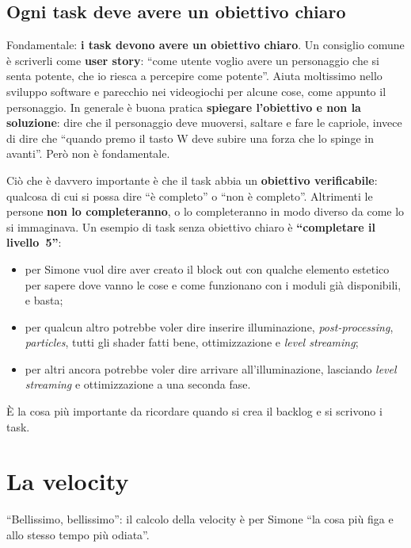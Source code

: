 \subsection{Ogni task deve avere un obiettivo chiaro}

Fondamentale: \textbf{i task devono avere un obiettivo chiaro}. Un consiglio
comune è scriverli come \textbf{user story}: ``come utente voglio avere un
personaggio che si senta potente, che io riesca a percepire come potente''.
Aiuta moltissimo nello sviluppo software e parecchio nei videogiochi per
alcune cose, come appunto il personaggio. In generale è buona pratica
\textbf{spiegare l'obiettivo e non la soluzione}: dire che il personaggio deve
muoversi, saltare e fare le capriole, invece di dire che ``quando premo il
tasto W deve subire una forza che lo spinge in avanti''. Però non è
fondamentale.

Ciò che è davvero importante è che il task abbia un \textbf{obiettivo
verificabile}: qualcosa di cui si possa dire ``è completo'' o ``non è
completo''. Altrimenti le persone \textbf{non lo completeranno}, o lo
completeranno in modo diverso da come lo si immaginava. Un esempio di task
senza obiettivo chiaro è \textbf{``completare il livello~5''}:
\begin{itemize}
  \item per Simone vuol dire aver creato il block out con qualche elemento
        estetico per sapere dove vanno le cose e come funzionano con i
        moduli già disponibili, e basta;
  \item per qualcun altro potrebbe voler dire inserire illuminazione,
        \emph{post-processing}, \emph{particles}, tutti gli shader fatti
        bene, ottimizzazione e \emph{level streaming};
  \item per altri ancora potrebbe voler dire arrivare all'illuminazione,
        lasciando \emph{level streaming} e ottimizzazione a una seconda fase.
\end{itemize}
È la cosa più importante da ricordare quando si crea il backlog e si
scrivono i task.

\section{La velocity}
\label{sec:z3-velocity}

``Bellissimo, bellissimo'': il calcolo della velocity è per Simone ``la cosa
più figa e allo stesso tempo più odiata''.


